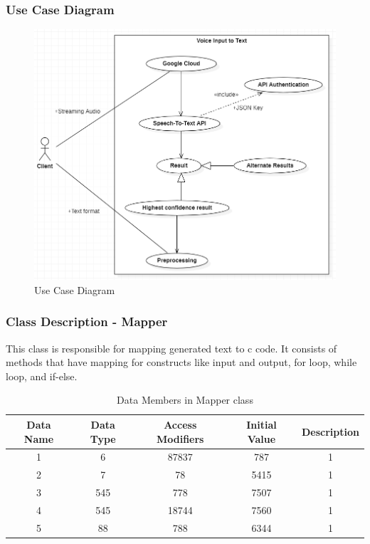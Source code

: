 \documentclass[12pt]{article}
\renewcommand{\thefigure}{\arabic{section}(\alph{figure})}
\renewcommand{\thefigure}{\arabic{section}.\arabic{subsection}(\alph{figure})}
\renewcommand{\thefigure}{\arabic{section}.\arabic{subsection}.\arabic{subsubsection}(\alph{figure})}
\renewcommand{\thetable}{\arabic{section}(\alph{table})}
\renewcommand{\thetable}{\arabic{section}.\arabic{subsection}(\alph{table})}
\renewcommand{\thetable}{\arabic{section}.\arabic{subsection}.\arabic{subsubsection}(\alph{table})}
\newcounter{subsubsubsection}[subsubsection]
\begin{document}
\subsubsection{Use Case Diagram}
\renewcommand{\thefigure}{\arabic{section}.\arabic{subsection}}

\begin{figure}[H]
{\centering
\centerline{
    \includegraphics[width=\textwidth]{useCase-1.png}
}
\caption{Use Case Diagram}
}
\end{figure}

\subsubsection{Class Description - Mapper}

This class is responsible for mapping generated text to c code. It consists of methods that have mapping for constructs like input and output, for loop,  while loop, and if-else.

\renewcommand{\thetable}{\arabic{section}.\arabic{subsection}.\arabic{subsubsection}}
\begin{table}[H]
\centering
\begin{tabular}{|c c c c c|} 
 \hline
 Data Name & Data Type & Access Modifiers & Initial Value & Description \\ [0.5ex] 
 \hline\hline
 1 & 6 & 87837 & 787 & 1 \\ 
 2 & 7 & 78 & 5415 & 1 \\
 3 & 545 & 778 & 7507 & 1\\
 4 & 545 & 18744 & 7560 & 1\\
 5 & 88 & 788 & 6344 & 1\\ [1ex] 
 \hline
\end{tabular}
\caption{Data Members in Mapper class}
\end{table}
\end{document}
